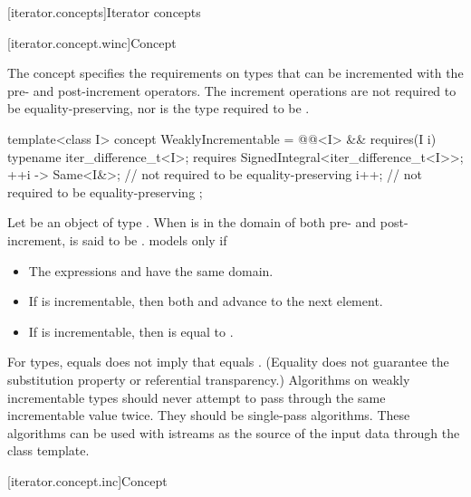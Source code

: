 \documentclass{wg21}
\begin{document}
[iterator.concepts]{Iterator concepts}


[iterator.concept.winc]{Concept }

\pnum
The  concept specifies the requirements on
types that can be incremented with the pre- and post-increment operators.
The increment operations are not required to be equality-preserving,
nor is the type required to be .

%
\begin{codeblock}
	template<class I>
	concept WeaklyIncrementable =
	@@<I> &&
	requires(I i) {
		typename iter_difference_t<I>;
		requires SignedIntegral<iter_difference_t<I>>;
		{ ++i } -> Same<I&>; // not required to be equality-preserving
		i++; // not required to be equality-preserving
	};
\end{codeblock}

\pnum
Let  be an object of type . When  is in the domain of
both pre- and post-increment,  is said to be .
 models  only if

\begin{itemize}
	\item The expressions  and  have the same domain.
	\item If  is incrementable, then both 
	and  advance  to the next element.
	\item If  is incrementable, then
	 is equal to
	.
\end{itemize}

\pnum
\begin{note}
	For   types,  equals  does not imply that 
	equals . (Equality does not guarantee the substitution property or referential
	transparency.) Algorithms on weakly incrementable types should never attempt to pass
	through the same incrementable value twice. They should be single-pass algorithms. These algorithms
	can be used with istreams as the source of the input data through the  class
	template.
\end{note}

[iterator.concept.inc]{Concept }
\end{document}
